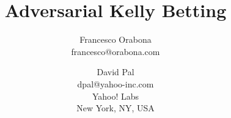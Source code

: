 \documentclass{article} %
\begin{document}
\nobibliography*

\title{Adversarial Kelly Betting}
\author{Francesco Orabona \\ francesco@orabona.com
\and David Pal \\ dpal@yahoo-inc.com\\
Yahoo! Labs\\New York, NY, USA}


\maketitle



\begin{abstract}%

\end{abstract}











\end{document}
